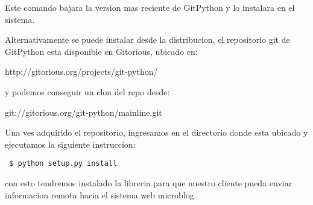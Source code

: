 Este comando bajara la version mas reciente de GitPython y lo instalara en el sistema.

Alternativamente se puede instalar desde la distribucion, el repositorio git de GitPython esta disponible en Gitorious, ubicado en:

http://gitorious.org/projects/git-python/

y podemos conseguir un clon del repo desde:

git://gitorious.org/git-python/mainline.git

Una ves adquirido el repositorio, ingresamos en el directorio donde esta ubicado y ejecutamos la siguiente instruccion:
\begin{verbatim}
 $ python setup.py install
\end{verbatim}

con esto tendremos instalado la libreria para que nuestro cliente pueda enviar informacion remota hacia el sistema web microblog.